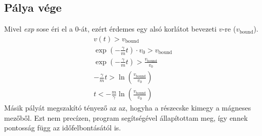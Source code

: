 \documentclass[a4paper]{article}
\begin{document}
\begin{multicols}{2}
\section{Pálya vége}
	Mivel \textit{exp} sose éri el a $0$-át, ezért érdemes egy alsó korlátot bevezeti $v$-re ($v_{\mathrm{bound}}$).
	\begin{align*}
		v(t) > v_{\mathrm{bound}} \\
		\exp(-\frac{\gamma}{m}t) \cdot v_0 > v_{\mathrm{bound}} \\
		\exp(-\frac{\gamma}{m}t) > \frac{v_{\mathrm{bound}}}{v_0} \\
		-\frac{\gamma}{m}t > \ln\left( \frac{v_{\mathrm{bound}}}{v_0} \right) \\
		t < -\frac{m}{\gamma} \ln\left( \frac{v_{\mathrm{bound}}}{v_0} \right)
	\end{align*}
	Másik pályát megszakító tényező az az, hogyha a részecske kimegy a mágneses mezőből. Ezt nem precízen, program segítségével állapítottam meg, így ennek pontosság függ az időfelbontásától is.

\end{multicols}
\end{document}
